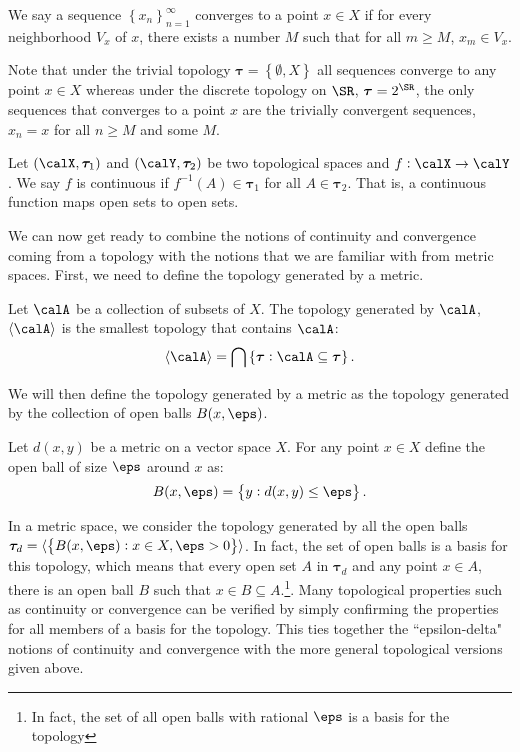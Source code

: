 \begin{definition}[Convergence]
	\label{def:convergence}
	We say a sequence \(\left\{x_n\right\}_{n=1}^\infty\) converges to a point \(x \in X\) if for every neighborhood  \(V_x\) of \(x\), there exists a number  \(M\) such that for all  \(m\geq M\), \(x_m \in V_x\). 
\end{definition}

Note that under the trivial topology \(\boldsymbol{\tau} = \left\{\emptyset, X\right\}\) all sequences converge to any point \(x \in X\) whereas under the discrete topology on  \(\SR\),  \(\boldsymbol{\tau} = 2^\SR\), the only sequences that converges to a point \(x\) are the trivially convergent sequences, \(x_n = x\) for all \(n \geq M\) and some \(M\).


\begin{definition}[Continuity]
	\label{def:continuity}
	Let \((\calX, \boldsymbol{\tau}_1)\) and \((\calY, \boldsymbol{\tau}_2)\) be two topological spaces and \(f:\calX\to\calY\). We say  \(f\) is continuous if  \(f^{-1}(A) \in \boldsymbol{\tau}_1\) for all \(A \in \boldsymbol{\tau}_2\). That is, a continuous function maps open sets to open sets. 
\end{definition}

We can now get ready to combine the notions of continuity and convergence coming from a topology with the notions that we are familiar with from metric spaces. First, we need to define the topology generated by a metric. 

\begin{definition}
	\label{def:generated}
	Let \(\calA\) be a collection of subsets of  \(X\). The topology generated by  \(\calA\), \(\langle\calA\rangle\) is the smallest topology that contains \(\calA\):
	\[
		\langle\calA\rangle = \bigcap \left\{\boldsymbol\tau: \calA\subseteq\boldsymbol{\tau}\right\}
	.\] 
\end{definition}

We will then define the topology generated by a metric as the topology generated by the collection of open balls \(B(x,\eps)\).

\begin{definition}
	\label{def:open-ball}
	Let \(d(x,y)\) be a metric on  a vector space  \(X\). For any point  \(x \in X\) define the open ball of size  \(\eps\) around  \(x\) as:
	\[
		B(x,\eps) = \left\{y: d(x,y) \leq \eps\right\}
	.\] 
\end{definition}

In a metric space, we consider the topology generated by all the open balls \(\boldsymbol{\tau}_d = \langle\left\{B(x,\eps):x \in X, \eps > 0\right\}\rangle\). In fact, the set of open balls is a basis for this topology, which means that every open set \(A\) in \(\boldsymbol{\tau}_d\) and any point \(x \in A\), there is an open ball \(B\) such that  \(x \in B \subseteq A\).\footnote{In fact, the set of all open balls with rational \(\eps\) is a basis for the topology}. Many topological properties such as continuity or convergence can be verified by simply confirming the properties for all members of a basis for the topology. This ties together the ``epsilon-delta" notions of continuity and convergence with the more general topological versions given above.

